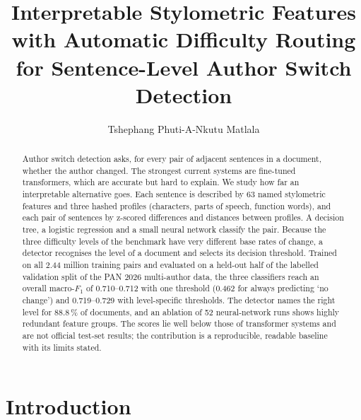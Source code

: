 \documentclass[runningheads]{llncs}
\begin{document}
\title{Interpretable Stylometric Features with Automatic Difficulty Routing for Sentence-Level Author Switch Detection}

\author{Tshephang Phuti-A-Nkutu Matlala}

\maketitle

\begin{abstract}
Author switch detection asks, for every pair of adjacent sentences in a document, whether the author changed. The strongest current systems are fine-tuned transformers, which are accurate but hard to explain. We study how far an interpretable alternative goes. Each sentence is described by 63 named stylometric features and three hashed profiles (characters, parts of speech, function words), and each pair of sentences by z-scored differences and distances between profiles. A decision tree, a logistic regression and a small neural network classify the pair. Because the three difficulty levels of the benchmark have very different base rates of change, a detector recognises the level of a document and selects its decision threshold. Trained on all 2.44 million training pairs and evaluated on a held-out half of the labelled validation split of the PAN 2026 multi-author data, the three classifiers reach an overall macro-$F_1$ of 0.710--0.712 with one threshold (0.462 for always predicting `no change') and 0.719--0.729 with level-specific thresholds. The detector names the right level for 88.8\,\% of documents, and an ablation of 52 neural-network runs shows highly redundant feature groups. The scores lie well below those of transformer systems and are not official test-set results; the contribution is a reproducible, readable baseline with its limits stated.

\end{abstract}

\section{Introduction}
\end{document}
